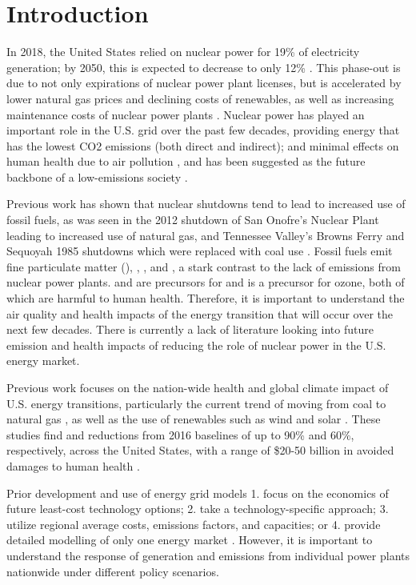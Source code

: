 \documentclass[12]{article}
\begin{document}
\section{Introduction}
In 2018, the United States relied on nuclear power for 19\% of electricity generation; by 2050, this is expected to decrease to only 12\% \citep{eia_annual_2020}. This phase-out is due to not only expirations of nuclear power plant licenses, but is accelerated by lower natural gas prices and declining costs of renewables, as well as increasing maintenance costs of nuclear power plants \citep{davis_market_2016}. Nuclear power has played an important role in the U.S. grid over the past few decades, providing energy that has the lowest CO2 emissions (both direct and indirect); and minimal effects on human health due to air pollution \citep{markandya_electricity_2007}, and has been suggested as the future backbone of a low-emissions society \citep{iea_nuclear_2019}. 

Previous work has shown that nuclear shutdowns tend to lead to increased use of fossil fuels, as was seen in the 2012 shutdown of San Onofre’s Nuclear Plant leading to increased use of natural gas, and Tennessee Valley’s Browns Ferry and Sequoyah 1985 shutdowns which were replaced with coal use \citep{davis_market_2016,severnini_impacts_2017}. Fossil fuels emit fine particulate matter (), , , and , a stark contrast to the lack of emissions from nuclear power plants.  and  are precursors for  and  is a precursor for ozone, both of which are harmful to human health. Therefore, it is important to understand the air quality and health impacts of the energy transition that will occur over the next few decades. There is currently a lack of literature looking into future emission and health impacts of reducing the role of nuclear power in the U.S. energy market. 

Previous work focuses on the nation-wide health and global climate impact of U.S. energy transitions, particularly the current trend of moving from coal to natural gas \citep{lueken_climate_2016, zhang_climate_2016}, as well as the use of renewables such as wind and solar \citep{millstein_climate_2017}. These studies find  and  reductions from 2016 baselines of up to 90\% and 60\%, respectively, across the United States, with a range of \$20-50 billion in avoided damages to human health \citep{lueken_climate_2016}. 

Prior development and use of energy grid models 1. focus on the economics of future least-cost technology options; 2. take a technology-specific approach; 3. utilize regional average costs, emissions factors, and capacities; or 4. provide detailed modelling of only one energy market \citep{jenkins_enhanced_2017, epa_ipm_2018}. However, it is important to understand the response of generation and emissions from individual power plants nationwide under different policy scenarios. 
\end{document}
